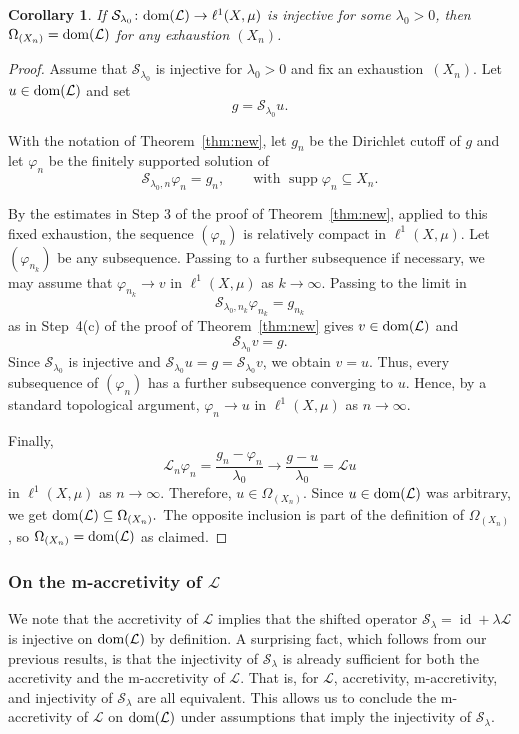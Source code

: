 \documentclass[letterpaper]{article}
\newtheorem{corollary}[lemma]{Corollary}
\theoremstyle{definition}
\theoremstyle{named}
\numberwithin{equation}{section}
\newcommand{\lm}{\lambda}
\newcommand{\dom}{\textnormal{dom}} %
\newcommand{\id}{\operatorname{id}}
\newcommand{\Deltaphi}{\mathcal{L}}
\begin{document}
\begin{corollary}
    If $\mathcal{S}_{\lambda_0} \colon \dom(\Deltaphi) \to \ell^1(X,\mu)$ 
    is injective for some $\lambda_0>0$, then $\Omega_{(X_n)}=\dom(\Deltaphi)$
    for any exhaustion $(X_n)$.
\end{corollary}
\begin{proof}
Assume that $\mathcal{S}_{\lambda_0}$ is
injective for  $\lambda_0>0$ and fix an exhaustion~$(X_n)$. 
Let $u\in\dom(\Deltaphi)$ and set
\[
g=\mathcal{S}_{\lambda_0}u.
\]

With the notation of Theorem~\ref{thm:new},  let $g_n$ be the Dirichlet cutoff of $g$ and let  $\varphi_n$ be the finitely supported solution of
\[
\mathcal{S}_{\lambda_0,n}\varphi_n=g_n, \qquad \text{with } \operatorname{supp}\varphi_n\subseteq X_n.
\]

By the estimates in Step 3 of the proof of Theorem~\ref{thm:new}, applied to this fixed
exhaustion, the sequence $(\varphi_n)$ is relatively compact in
$\ell^1(X,\mu)$. Let $(\varphi_{n_k})$ be any subsequence. Passing to a further subsequence if
necessary, we may assume that
$\varphi_{n_k}\to v$
in $\ell^1(X,\mu)$ as $k \to \infty$.
Passing to the limit in
\[
\mathcal{S}_{\lambda_0,n_k}\varphi_{n_k}=g_{n_k}
\]
as in Step~4(c) of the proof of Theorem~\ref{thm:new} gives $v\in\dom(\Deltaphi)$ and
\[
\mathcal{S}_{\lambda_0}v=g.
\]
Since $\mathcal{S}_{\lambda_0}$ is injective and $\mathcal{S}_{\lambda_0}u=g = \mathcal{S}_{\lambda_0}v$, we obtain
$v=u$. Thus, every subsequence of $(\varphi_n)$ has a further subsequence
converging to $u$. Hence, by a standard topological argument,
$\varphi_n \to u$
in $\ell^1(X,\mu)$ as $n \to \infty$.

Finally,
\[
\mathcal{L}_n \varphi_n=\frac{g_n-\varphi_n}{\lambda_0}
\to
\frac{g-u}{\lambda_0}
=\Deltaphi u
\]
in $\ell^1(X,\mu)$ as $n \to \infty$.
Therefore, $u\in\Omega_{(X_n)}$. Since $u\in\dom(\Deltaphi)$ was arbitrary, we get
$\dom(\Deltaphi)\subseteq\Omega_{(X_n)}.$
The opposite inclusion is part of the definition of $\Omega_{(X_n)}$, so $\Omega_{(X_n)}=\dom(\Deltaphi)$ as claimed.
\end{proof}
 

\subsubsection{\texorpdfstring{On the m-accretivity of $\Deltaphi$}{On the m-accretivity of Delta Phi}}

We note that the accretivity of $\Deltaphi$ implies that
the shifted operator $\mathcal{S}_\lambda=\id +\lm \Deltaphi$
is injective on $\dom(\Deltaphi)$ by definition.
A surprising fact, which follows from our previous results, is that the injectivity
of $\mathcal{S}_\lm$ is already sufficient for both the accretivity and the m-accretivity of $\Deltaphi$. 
That is, for $\Deltaphi$, accretivity, m-accretivity, and injectivity of $\mathcal{S}_\lm$ are all equivalent.
This allows us to conclude the m-accretivity of $\Deltaphi$ on $\dom(\Deltaphi)$
under assumptions that imply the injectivity of $\mathcal{S}_\lm$.
\end{document}
